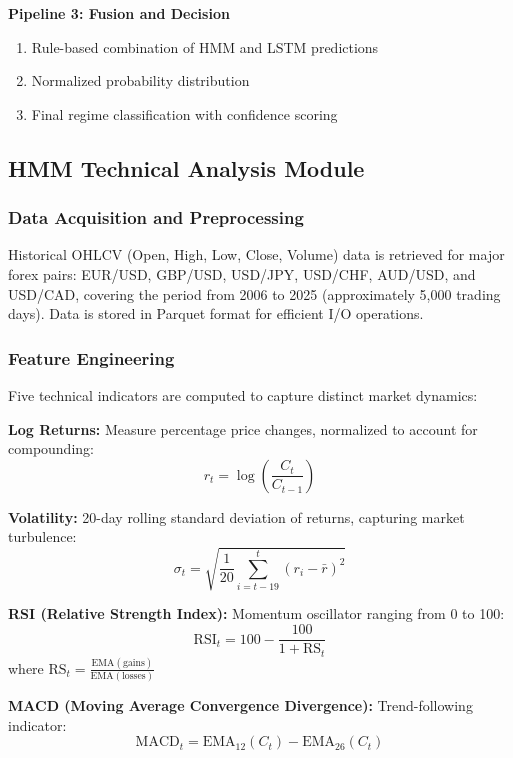 \documentclass[conference]{IEEEtran}
\begin{document}
\textbf{Pipeline 3: Fusion and Decision}
\begin{enumerate}
\item Rule-based combination of HMM and LSTM predictions
\item Normalized probability distribution
\item Final regime classification with confidence scoring
\end{enumerate}

\subsection{HMM Technical Analysis Module}

\subsubsection{Data Acquisition and Preprocessing}
Historical OHLCV (Open, High, Low, Close, Volume) data is retrieved for major forex pairs: EUR/USD, GBP/USD, USD/JPY, USD/CHF, AUD/USD, and USD/CAD, covering the period from 2006 to 2025 (approximately 5,000 trading days). Data is stored in Parquet format for efficient I/O operations.

\subsubsection{Feature Engineering}
Five technical indicators are computed to capture distinct market dynamics:

\textbf{Log Returns:} Measure percentage price changes, normalized to account for compounding:
\begin{equation}
r_t = \log\left(\frac{C_t}{C_{t-1}}\right)
\end{equation}

\textbf{Volatility:} 20-day rolling standard deviation of returns, capturing market turbulence:
\begin{equation}
\sigma_t = \sqrt{\frac{1}{20}\sum_{i=t-19}^{t}(r_i - \bar{r})^2}
\end{equation}

\textbf{RSI (Relative Strength Index):} Momentum oscillator ranging from 0 to 100:
\begin{equation}
\text{RSI}_t = 100 - \frac{100}{1 + \text{RS}_t}
\end{equation}
where $\text{RS}_t = \frac{\text{EMA}(\text{gains})}{\text{EMA}(\text{losses})}$

\textbf{MACD (Moving Average Convergence Divergence):} Trend-following indicator:
\begin{equation}
\text{MACD}_t = \text{EMA}_{12}(C_t) - \text{EMA}_{26}(C_t)
\end{equation}
\end{document}
